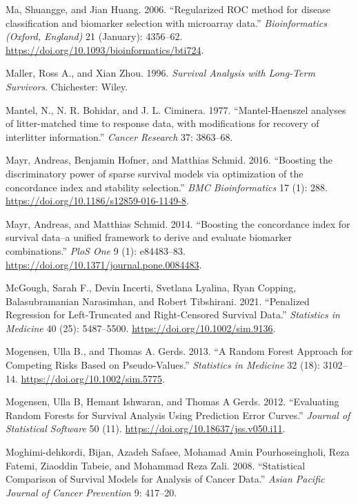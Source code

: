 \documentclass[
  letterpaper,
  krantz2]{style/krantz}
\newlength{\cslhangindent}
\newenvironment{CSLReferences}[2] %
 {\begin{list}{}{%
  \setlength{\itemindent}{0pt}
  \setlength{\leftmargin}{0pt}
  \setlength{\parsep}{0pt}
  \ifodd #1
   \setlength{\leftmargin}{\cslhangindent}
   \setlength{\itemindent}{-1\cslhangindent}
  \fi
  \setlength{\itemsep}{#2\baselineskip}}}
 {\end{list}}
\begin{document}
\begin{CSLReferences}{1}{0}
Ma, Shuangge, and Jian Huang. 2006. {``{Regularized ROC method for
disease classification and biomarker selection with microarray data}.''}
\emph{Bioinformatics (Oxford, England)} 21 (January): 4356--62.
\url{https://doi.org/10.1093/bioinformatics/bti724}.

Maller, Ross A., and Xian Zhou. 1996. \emph{{Survival Analysis with
Long-Term Survivors}}. Chichester: Wiley.

Mantel, N., N. R. Bohidar, and J. L. Ciminera. 1977. {``{Mantel-Haenszel
analyses of litter-matched time to response data, with modifications for
recovery of interlitter information.}''} \emph{Cancer Research} 37:
3863--68.

Mayr, Andreas, Benjamin Hofner, and Matthias Schmid. 2016. {``{Boosting
the discriminatory power of sparse survival models via optimization of
the concordance index and stability selection}.''} \emph{BMC
Bioinformatics} 17 (1): 288.
\url{https://doi.org/10.1186/s12859-016-1149-8}.

Mayr, Andreas, and Matthias Schmid. 2014. {``{Boosting the concordance
index for survival data--a unified framework to derive and evaluate
biomarker combinations}.''} \emph{PloS One} 9 (1): e84483--83.
\url{https://doi.org/10.1371/journal.pone.0084483}.

McGough, Sarah F., Devin Incerti, Svetlana Lyalina, Ryan Copping,
Balasubramanian Narasimhan, and Robert Tibshirani. 2021. {``Penalized
Regression for Left-Truncated and Right-Censored Survival Data.''}
\emph{Statistics in Medicine} 40 (25): 5487--5500.
\url{https://doi.org/10.1002/sim.9136}.

Mogensen, Ulla B., and Thomas A. Gerds. 2013. {``A Random Forest
Approach for Competing Risks Based on Pseudo-Values.''} \emph{Statistics
in Medicine} 32 (18): 3102--14. \url{https://doi.org/10.1002/sim.5775}.

Mogensen, Ulla B, Hemant Ishwaran, and Thomas A Gerds. 2012.
{``{Evaluating Random Forests for Survival Analysis Using Prediction
Error Curves}.''} \emph{Journal of Statistical Software} 50 (11).
\url{https://doi.org/10.18637/jss.v050.i11}.

Moghimi-dehkordi, Bijan, Azadeh Safaee, Mohamad Amin Pourhoseingholi,
Reza Fatemi, Ziaoddin Tabeie, and Mohammad Reza Zali. 2008.
{``{Statistical Comparison of Survival Models for Analysis of Cancer
Data}.''} \emph{Asian Pacific Journal of Cancer Prevention} 9: 417--20.


\end{CSLReferences}
\end{document}
